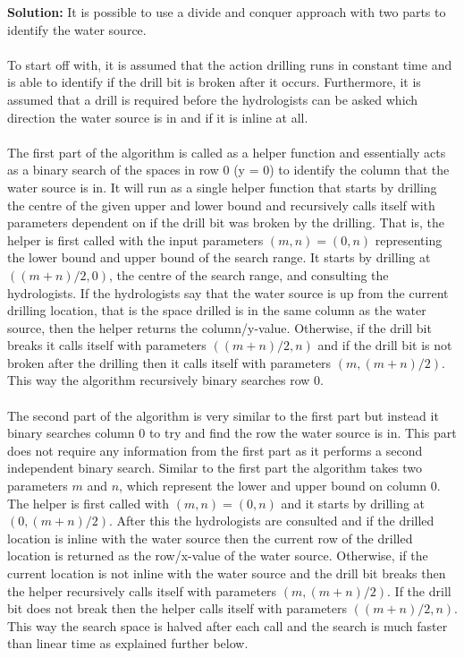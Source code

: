 \documentclass[a4,13pt]{extarticle}
\newenvironment{Solution}{\color{blue}\textbf{Solution:}}{}
\begin{document}
\begin{enumerate}
\begin{enumerate}
\begin{Solution}
				It is possible to use a divide and conquer approach with two parts to identify the water source.
				\\
				\\
				To start off with, it is assumed that the action drilling runs in constant time and is able to identify if the drill bit is broken after it occurs. Furthermore, it is assumed that a drill is required before the hydrologists can be asked which direction the water source is in and if it is inline at all.
				\\
				\\
				The first part of the algorithm is called as a helper function and essentially acts as a binary search of the spaces in row 0 (y = 0) to identify the column that the water source is in. It will run as a single helper function that starts by drilling the centre of the given upper and lower bound and recursively calls itself with parameters dependent on if the drill bit was broken by the drilling. That is, the helper is first called with the input parameters $(m, n) = (0, n)$ representing the lower bound and upper bound of the search range. It starts by drilling at $((m + n)/2, 0)$, the centre of the search range, and consulting the hydrologists. If the hydrologists say that the water source is up from the current drilling location, that is the space drilled is in the same column as the water source, then the helper returns the column/y-value. Otherwise, if the drill bit breaks it calls itself with parameters $((m + n)/2, n)$ and if the drill bit is not broken after the drilling then it calls itself with parameters $(m, (m + n)/2)$. This way the algorithm recursively binary searches row 0.
				\\
				\\
				The second part of the algorithm is very similar to the first part but instead it binary searches column 0 to try and find the row the water source is in. This part does not require any information from the first part as it performs a second independent binary search. Similar to the first part the algorithm takes two parameters $m$ and $n$, which represent the lower and upper bound on column 0. The helper is first called with $(m, n) = (0, n)$ and it starts by drilling at $(0, (m + n)/2)$. After this the hydrologists are consulted and if the drilled location is inline with the water source then the current row of the drilled location is returned as the row/x-value of the water source. Otherwise, if the current location is not inline with the water source and the drill bit breaks then the helper recursively calls itself with parameters $(m, (m + n)/2)$. If the drill bit does not break then the helper calls itself with parameters $((m + n)/2, n)$. This way the search space is halved after each call and the search is much faster than linear time as explained further below.

\end{Solution}
\end{enumerate}
\end{enumerate}
\end{document}
